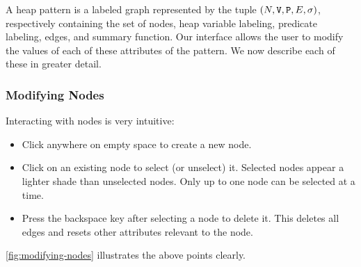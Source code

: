 A heap pattern is a labeled graph represented by the tuple $(N, \mathtt{V}, \mathtt{P}, E, \sigma)$, respectively containing the set of nodes, heap variable labeling, predicate labeling, edges, and summary function. Our interface allows the user to modify the values of each of these attributes of the pattern. We now describe each of these in greater detail.

\subsubsection{Modifying Nodes}
Interacting with nodes is very intuitive:
\begin{itemize}
  \item Click anywhere on empty space to create a new node.
  \item Click on an existing node to select (or unselect) it. Selected nodes appear a lighter shade than unselected nodes. Only up to one node can be selected at a time.
  \item Press the backspace key after selecting a node to delete it. This deletes all edges and resets other attributes relevant to the node.
\end{itemize}

\autoref{fig:modifying-nodes} illustrates the above points clearly.

